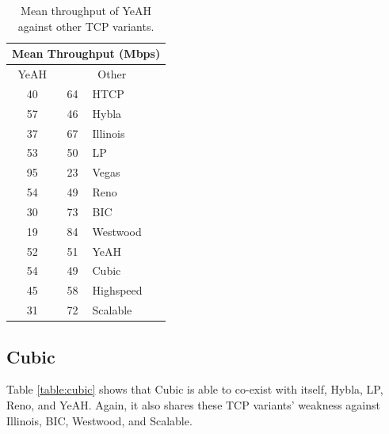 \documentclass[11pt,a4paper,twocolumn]{article}
\begin{document}
\begin{table}[h!]
	\begin{center}
		\begin{tabular}{| c | c | l |}
    			\hline
			\multicolumn{3}{|c|}{Mean Throughput (Mbps)} \\
    			\hline
    			YeAH &  \multicolumn{2}{|c|}{Other}  \\
			\hline
    			40 & 64 & HTCP \\
			\hline
    			57 & 46 & Hybla \\
			\hline
    			37 & 67 & Illinois \\
			\hline
    			53 & 50 & LP \\
			\hline
    			95 & 23 & Vegas \\
			\hline
    			54 & 49 & Reno \\
			\hline
    			30 & 73 & BIC \\
			\hline
    			19 & 84 & Westwood \\
			\hline
    			52 & 51 & YeAH \\
			\hline
    			54 & 49 & Cubic \\
			\hline
    			45 & 58 & Highspeed \\
			\hline
    			31 & 72 & Scalable \\
    			\hline
    		\end{tabular}
  	\end{center}
  	\caption{Mean throughput of YeAH against other TCP variants.}
	\label{table:yeah}
\end{table}

\subsection{Cubic}
\label{subsec:cubic}
Table \ref{table:cubic} shows that Cubic is able to co-exist with itself, Hybla, LP, Reno, and YeAH.
Again, it also shares these TCP variants' weakness against Illinois, BIC, Westwood, and Scalable.
\end{document}
